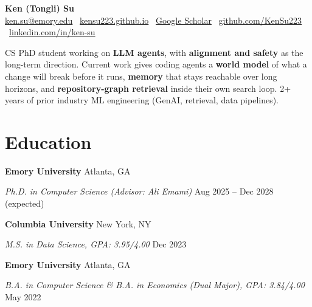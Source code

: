 \documentclass[letterpaper,10pt]{article}
\newcommand{\BODYSIZE}{\fontsize{9.5}{11.3}\selectfont}
\newcommand{\SUMMARYSIZE}{\fontsize{9}{10.8}\selectfont}
\newcommand{\edu}[4]{%
  \textbf{#1} \hfill #2\par
  \textit{#3} \hfill #4\par\vspace{2pt}
}
\begin{document}
\BODYSIZE

\begin{center}
  {\LARGE\bfseries Ken (Tongli) Su}\\[3pt]
  {\small \href{mailto:ken.su@emory.edu}{ken.su@emory.edu} \textperiodcentered\
  \href{https://kensu223.github.io}{kensu223.github.io} \textperiodcentered\
  \href{https://scholar.google.com/citations?user=1u6fBBAAAAAJ&hl=en}{Google Scholar} \textperiodcentered\
  \href{https://github.com/KenSu223}{github.com/KenSu223} \textperiodcentered\
  \href{https://www.linkedin.com/in/ken-su}{linkedin.com/in/ken-su}}
\end{center}
\vspace{-2pt}

{\SUMMARYSIZE
CS PhD student working on \textbf{LLM agents}, with \textbf{alignment and safety} as the long-term direction. Current work gives coding agents
a \textbf{world model} of what a change will break before it runs, \textbf{memory} that stays reachable over long horizons, and
\textbf{repository-graph retrieval} inside their own search loop. 2+ years of prior industry ML engineering (GenAI, retrieval, data pipelines).
\par}
\vspace{1pt}

\section{Education}
\edu{Emory University}{Atlanta, GA}{Ph.D. in Computer Science (Advisor: Ali Emami)}{Aug 2025 -- Dec 2028 (expected)}
\edu{Columbia University}{New York, NY}{M.S. in Data Science, GPA: 3.95/4.00}{Dec 2023}
\edu{Emory University}{Atlanta, GA}{B.A. in Computer Science \& B.A. in Economics (Dual Major), GPA: 3.84/4.00}{May 2022}

\end{document}
